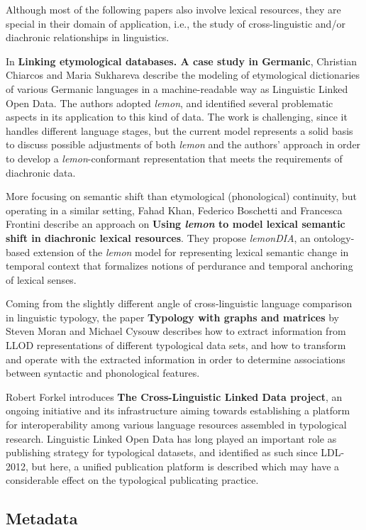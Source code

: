 Although most of the following papers also involve lexical resources, they are special in their domain of application, i.e., the study of cross-linguistic and/or diachronic relationships in linguistics.

	In \textbf{Linking etymological databases. A case study in Germanic}, Christian Chiarcos and Maria Sukhareva
	describe the modeling of etymological dictionaries of various Germanic languages in a machine-readable way as Linguistic Linked Open Data. 
	The authors adopted \emph{lemon}, and identified several problematic aspects in its application to this kind of data.
	The work is challenging, since it handles different language stages, but the current model represents a solid basis to discuss possible adjustments of both \emph{lemon} and the authors' approach in order to develop a \emph{lemon}-conformant representation that meets the requirements of diachronic data.
		
	More focusing on semantic shift than etymological (phonological) continuity, but operating in a similar setting, 
	Fahad Khan, Federico Boschetti and Francesca Frontini describe an approach on \textbf{Using \emph{lemon} to model lexical semantic shift in diachronic lexical resources}. 
	They propose \emph{lemonDIA}, an ontology-based extension of the \emph{lemon} model for representing lexical semantic change in temporal context that formalizes notions of perdurance and temporal anchoring of lexical senses. 

	Coming from the slightly different angle of cross-linguistic language comparison in linguistic typology, the paper 
	\textbf{Typology with graphs and matrices} by Steven Moran and Michael Cysouw describes how to extract information from LLOD representations of different typological data sets, and how to transform and operate with the extracted information in order to determine associations between syntactic and phonological features.

	Robert Forkel introduces \textbf{The Cross-Linguistic Linked Data project},
	an ongoing initiative and its infrastructure aiming towards establishing a platform 
	for interoperability among various language resources assembled in typological research. 
	Linguistic Linked Open Data has long played an important role as publishing strategy for 
	typological datasets, and identified as such since LDL-2012, but here, a unified 
	publication platform is described which may have a considerable effect on the typological publicating practice.
	
\subsection{Metadata}

